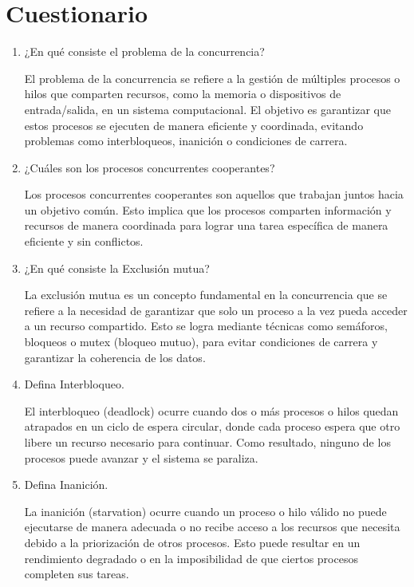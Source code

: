 \documentclass[12pt, a4paper]{article} %
\begin{document}
\clearpage
\section{Cuestionario}

\begin{enumerate}
	\item ¿En qué consiste el problema de la concurrencia?

	El problema de la concurrencia se refiere a la gestión de múltiples procesos o hilos que comparten recursos, como la memoria o dispositivos de entrada/salida, en un sistema computacional. El objetivo es garantizar que estos procesos se ejecuten de manera eficiente y coordinada, evitando problemas como interbloqueos, inanición o condiciones de carrera.

	\item ¿Cuáles son los procesos concurrentes cooperantes?

	Los procesos concurrentes cooperantes son aquellos que trabajan juntos hacia un objetivo común. Esto implica que los procesos comparten información y recursos de manera coordinada para lograr una tarea específica de manera eficiente y sin conflictos.


	\item ¿En qué consiste la Exclusión mutua?

	La exclusión mutua es un concepto fundamental en la concurrencia que se refiere a la necesidad de garantizar que solo un proceso a la vez pueda acceder a un recurso compartido. Esto se logra mediante técnicas como semáforos, bloqueos o mutex (bloqueo mutuo), para evitar condiciones de carrera y garantizar la coherencia de los datos.


	\item Defina Interbloqueo.

	El interbloqueo (deadlock) ocurre cuando dos o más procesos o hilos quedan atrapados en un ciclo de espera circular, donde cada proceso espera que otro libere un recurso necesario para continuar. Como resultado, ninguno de los procesos puede avanzar y el sistema se paraliza.

	\item Defina Inanición.

	La inanición (starvation) ocurre cuando un proceso o hilo válido no puede ejecutarse de manera adecuada o no recibe acceso a los recursos que necesita debido a la priorización de otros procesos. Esto puede resultar en un rendimiento degradado o en la imposibilidad de que ciertos procesos completen sus tareas.




\end{enumerate}
\end{document}
